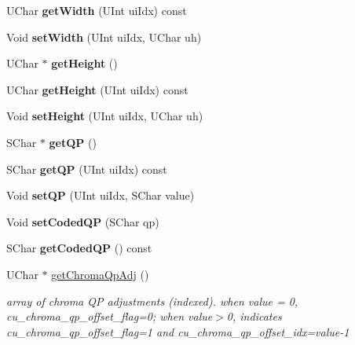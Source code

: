\begin{DoxyCompactItemize}
U\+Char {\bfseries get\+Width} (U\+Int ui\+Idx) const
\item 
\mbox{\label{class_t_com_data_c_u_a7db82449acfbcd9201985821d59cd575}} 
Void {\bfseries set\+Width} (U\+Int ui\+Idx, U\+Char uh)
\item 
\mbox{\label{class_t_com_data_c_u_afe9754b53606d33a506f8c070f84dc7a}} 
U\+Char $\ast$ {\bfseries get\+Height} ()
\item 
\mbox{\label{class_t_com_data_c_u_ac3f4883dbeadda544507135d9b659733}} 
U\+Char {\bfseries get\+Height} (U\+Int ui\+Idx) const
\item 
\mbox{\label{class_t_com_data_c_u_a6296517fccbdbd20567e219a22863b9c}} 
Void {\bfseries set\+Height} (U\+Int ui\+Idx, U\+Char uh)
\item 
\mbox{\label{class_t_com_data_c_u_a49b71b35a7ec63cb4d6a963f3c5e3d08}} 
S\+Char $\ast$ {\bfseries get\+QP} ()
\item 
\mbox{\label{class_t_com_data_c_u_ad32bd243097e0c713263344de9c799c0}} 
S\+Char {\bfseries get\+QP} (U\+Int ui\+Idx) const
\item 
\mbox{\label{class_t_com_data_c_u_a68728ff9bc79ff5dce7174b616f82004}} 
Void {\bfseries set\+QP} (U\+Int ui\+Idx, S\+Char value)
\item 
\mbox{\label{class_t_com_data_c_u_a3c54f50a28d55c1f7dfdc703807fe92a}} 
Void {\bfseries set\+Coded\+QP} (S\+Char qp)
\item 
\mbox{\label{class_t_com_data_c_u_a06e9e197827980f7bed0128515624e84}} 
S\+Char {\bfseries get\+Coded\+QP} () const
\item 
\mbox{\label{class_t_com_data_c_u_a5fb471621ed55e3a96be699225d13450}} 
U\+Char $\ast$ \hyperlink{class_t_com_data_c_u_a5fb471621ed55e3a96be699225d13450}{get\+Chroma\+Qp\+Adj} ()
\begin{DoxyCompactList}\small\item\em array of chroma QP adjustments (indexed). when value = 0, cu\+\_\+chroma\+\_\+qp\+\_\+offset\+\_\+flag=0; when value$>$0, indicates cu\+\_\+chroma\+\_\+qp\+\_\+offset\+\_\+flag=1 and cu\+\_\+chroma\+\_\+qp\+\_\+offset\+\_\+idx=value-\/1 \end{DoxyCompactList}\item 

\end{DoxyCompactItemize}
